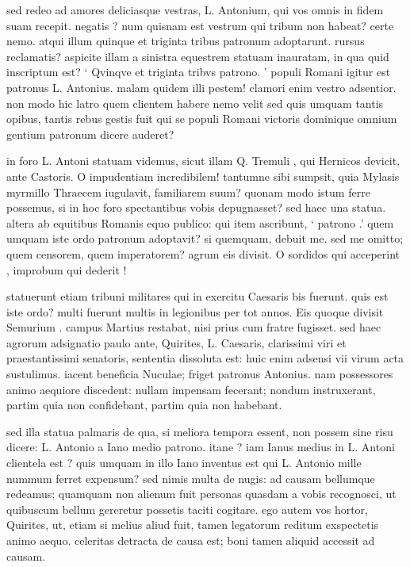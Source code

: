  sed redeo ad amores deliciasque vestras, L. Antonium, qui vos omnis in fidem suam recepit. negatis ? num quisnam est vestrum qui tribum non habeat? certe nemo. atqui illum quinque et triginta tribus patronum adoptarunt. rursus reclamatis? aspicite illam a sinistra equestrem statuam inauratam, in qua quid inscriptum est? ` Qvinqve et triginta tribvs patrono. ' populi Romani igitur est patronus L. Antonius. malam quidem illi pestem! clamori enim vestro adsentior. non modo hic latro quem clientem habere nemo velit sed quis umquam tantis opibus, tantis rebus gestis fuit qui se populi Romani victoris dominique omnium gentium patronum dicere auderet?

 in foro L. Antoni statuam videmus, sicut illam Q. Tremuli , qui Hernicos devicit, ante Castoris. O impudentiam incredibilem! tantumne sibi sumpsit, quia Mylasis myrmillo Thraecem iugulavit, familiarem suum? quonam modo istum ferre possemus, si in hoc foro spectantibus vobis depugnasset? sed haec una statua. altera ab equitibus Romanis equo publico: qui item ascribunt, ` patrono .' quem umquam iste ordo patronum adoptavit? si quemquam, debuit me. sed me omitto; quem censorem, quem imperatorem? agrum eis divisit. O sordidos qui acceperint , improbum qui dederit !

 statuerunt etiam tribuni militares qui in exercitu Caesaris bis fuerunt. quis est iste ordo? multi fuerunt multis in legionibus per tot annos. Eis quoque divisit Semurium . campus Martius restabat, nisi prius cum fratre fugisset. sed haec agrorum adsignatio paulo ante, Quirites, L. Caesaris, clarissimi viri et praestantissimi senatoris, sententia dissoluta est: huic enim adsensi vii virum acta sustulimus. iacent beneficia Nuculae; friget patronus Antonius. nam possessores animo aequiore discedent: nullam impensam fecerant; nondum instruxerant, partim quia non confidebant, partim quia non habebant.

 sed illa statua palmaris de qua, si meliora tempora essent, non possem sine risu dicere: L. Antonio a Iano medio patrono. itane ? iam Ianus medius in L. Antoni clientela est ? quis umquam in illo Iano inventus est qui L. Antonio mille nummum ferret expensum? sed nimis multa de nugis: ad causam bellumque redeamus; quamquam non alienum fuit personas quasdam a vobis recognosci, ut quibuscum bellum gereretur possetis taciti cogitare. ego autem vos hortor, Quirites, ut, etiam si melius aliud fuit, tamen legatorum reditum exspectetis animo aequo. celeritas detracta de causa est; boni tamen aliquid accessit ad causam.

